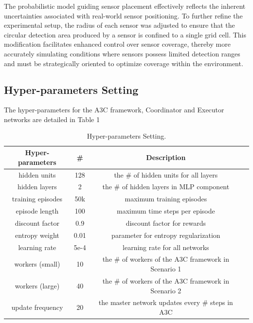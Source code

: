 \documentclass[preprint,12pt]{elsarticle}
\begin{document}
The probabilistic model guiding sensor placement effectively reflects
the inherent uncertainties associated with real-world sensor positioning. To further refine the experimental setup, the radius of each sensor was
adjusted to ensure that the circular detection area produced by a sensor is
confined to a single grid cell. This modification facilitates enhanced control
over sensor coverage, thereby more accurately simulating conditions where
sensors possess limited detection ranges and must be strategically oriented
to optimize coverage within the environment.
\subsection{Hyper-parameters Setting}
The hyper-parameters for the A3C framework, Coordinator and Executor networks are detailed in Table 1
\begin{table}[ht]
\caption{Hyper-parameters Setting.}
\centering
\footnotesize
\begin{tabular}{cccc}
\hline
\textbf{Hyper-parameters} & \textbf{\#} & \textbf{Description} \\
\hline
hidden units & 128 & the \# of hidden units for all layers \\

hidden layers & 2 & the \# of hidden layers in MLP component\\

training episodes & 50k & maximum training episodes \\

episode length & 100 & maximum time steps per episode \\

discount factor & 0.9 & discount factor for rewards \\

entropy weight & 0.01 & parameter for entropy regularization \\

learning rate & 5e-4 & learning rate for all networks \\

workers (small) & 10 & the \# of workers of the A3C framework in Scenario 1 \\

workers (large) & 40 & the \# of workers of the A3C framework in Scenario 2 \\

update frequency & 20 & the master network updates every \# steps in A3C \\
\hline
\end{tabular}
\end{table}
\end{document}

